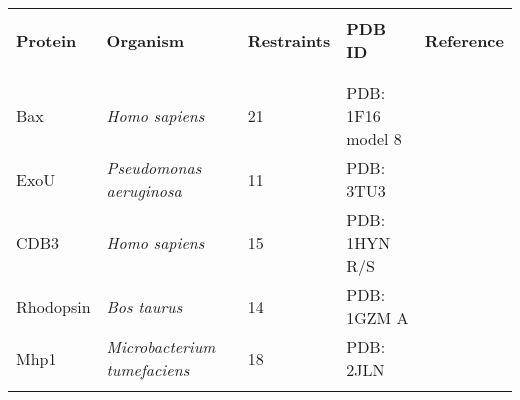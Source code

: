 

\begin{center}
\begin{tabular}{l l l l l}
\toprule \\
 \textbf{Protein} & \textbf{Organism} & \textbf{Restraints} & \textbf{PDB ID} & \textbf{Reference}  \\ \\
\midrule \\
Bax & \emph{Homo sapiens} & 21 & PDB: 1F16 model 8 & \citep*{Bleicken2014}  \\ 
ExoU & \emph{Pseudomonas aeruginosa} & 11 & PDB: 3TU3 & \citep*{Fischer2017} \\
CDB3 & \emph{Homo sapiens} & 15 & PDB: 1HYN R/S & \citep*{Zhou2005} \\
Rhodopsin & \emph{Bos taurus} & 14 & PDB: 1GZM A & \citep*{Altenbach2008} \\
Mhp1 & \emph{Microbacterium tumefaciens} & 18 & PDB: 2JLN & \citep*{Weyand2008} \\

\bottomrule \\
\end{tabular} 
\end{center}



